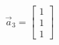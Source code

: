 \documentclass[preview]{standalone}
\begin{document}
\begin{align*}
\vec{a}_3=\begin{bmatrix} 1 \\ 1 \\ 1 \end{bmatrix}
\end{align*}
\end{document}
